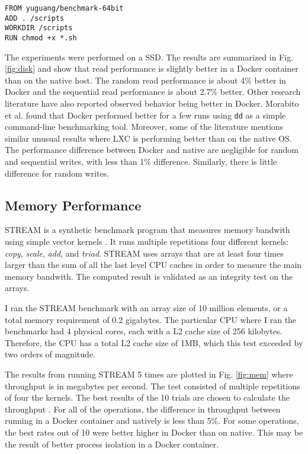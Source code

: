 \documentclass[11pt]{article}
\begin{document}
\begin{itemize}
\begin{lstlisting}
FROM yuguang/benchmark-64bit
ADD . /scripts
WORKDIR /scripts
RUN chmod +x *.sh
\end{lstlisting}
The experiments were performed on a SSD. The results are summarized in Fig. \ref{fig:disk} and show that read performance is slightly better in a Docker container than on the native host. The random read performance is about 4\% better in Docker and the sequential read performance is about 2.7\% better. Other research literature have also reported observed behavior being better in Docker. Morabito et al. found that Docker performed better for a few runs using \texttt{dd} as a simple command-line benchmarking tool. Moreover, some of the literature \cite{estrada} mentions similar unusual results where LXC is performing better than on the native OS. The performance difference between Docker and native are negligible for random and sequential writes, with less than 1\% difference. Similarly, there is little difference for random writes. 

\subsection{Memory Performance}
STREAM is a synthetic benchmark program that measures memory bandwith using simple vector kernels \cite{mccalpin}. It runs multiple repetitions four different kernels: \textit{copy}, \textit{scale}, \textit{add}, and \textit{triad}. STREAM uses arrays that are at least four times larger than the sum of all the last level CPU caches in order to measure the main memory bandwith. The computed result is validated as an integrity test on the arrays. 


I ran the
STREAM benchmark with an array size of 10 million elements, or
a total memory requirement of 0.2 gigabytes. The particular CPU
where I ran the benchmarks had 4 physical cores, each with a L2 cache size of 256 kilobytes. 
Therefore, the CPU has a total L2 cache size of 1MB, which this test exceeded by
two orders of magnitude.

The results from running STREAM 5 times are plotted in Fig. \ref{fig:mem} where throughput is in megabytes per second. 
The test consisted of multiple repetitions of four the kernels. The best results of the 10 trials are chosen to calculate the throughput \cite{mccalpin}. 
For all of the operations, the difference in throughput between running in a Docker container and natively is less than 5\%. For some operations, the best rates out of 10 were better higher in Docker than on native. This may be the result of better process isolation in a Docker container. 


\end{itemize}
\end{document}
